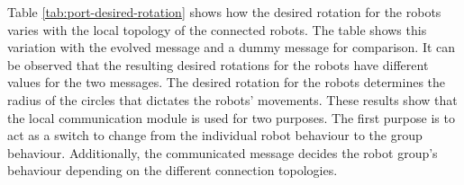 Table \ref{tab:port-desired-rotation} shows how the desired rotation for the robots varies with the local topology of the connected robots.
The table shows this variation with the evolved message and a dummy message for comparison.
It can be observed that the resulting desired rotations for the robots have different values for the two messages.
The desired rotation for the robots determines the radius of the circles that dictates the robots' movements.
These results show that the local communication module is used for two purposes.
The first purpose is to act as a switch to change from the individual robot behaviour to the group behaviour.
Additionally, the communicated message decides the robot group's behaviour depending on the different connection topologies.




























